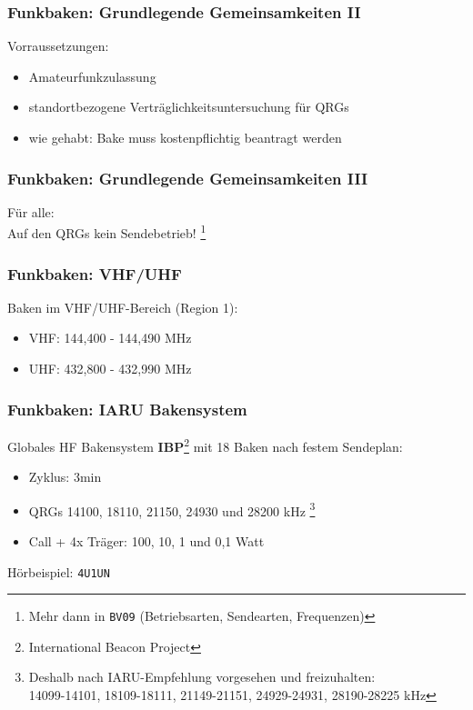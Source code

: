 \begin{frame}
    \frametitle{Funkbaken: Grundlegende Gemeinsamkeiten II}

    Vorraussetzungen:

    \begin{itemize}
        \item Amateurfunkzulassung
        \item standortbezogene Verträglichkeitsuntersuchung für QRGs
        \item wie gehabt: Bake muss kostenpflichtig beantragt werden
    \end{itemize}

\end{frame}

\begin{frame}
    \frametitle{Funkbaken: Grundlegende Gemeinsamkeiten III}

    \begin{center}
        Für alle: \\[2em]
        \Large Auf den QRGs kein Sendebetrieb!
        \footnote{Mehr dann in \texttt{BV09} (Betriebsarten, Sendearten, Frequenzen)}
    \end{center}

\end{frame}

\begin{frame}
    \frametitle{Funkbaken: VHF/UHF}

    Baken im VHF/UHF-Bereich (Region 1):

    \begin{itemize}
        \item VHF: 144,400 - 144,490 MHz
        \item UHF: 432,800 - 432,990 MHz
    \end{itemize}

\end{frame}

\begin{frame}
    \frametitle{Funkbaken: IARU Bakensystem}

    Globales HF Bakensystem \textbf{IBP}\footnote{International Beacon Project}
    mit 18 Baken nach festem Sendeplan:

    \begin{itemize}
        \item Zyklus: 3min
        \item QRGs 14100, 18110, 21150, 24930 und 28200 kHz
              \footnote{Deshalb nach IARU-Empfehlung vorgesehen und freizuhalten: \\
              \scriptsize 14099-14101, 18109-18111, 21149-21151, 24929-24931, 28190-28225 kHz}
        \item Call + 4x Träger: 100, 10, 1 und 0,1 Watt
    \end{itemize}

    \begin{center}
        Hörbeispiel: \Large \texttt{4U1UN} \hyperlink{refs}{\cite{ibp}}
    \end{center}

\end{frame}

